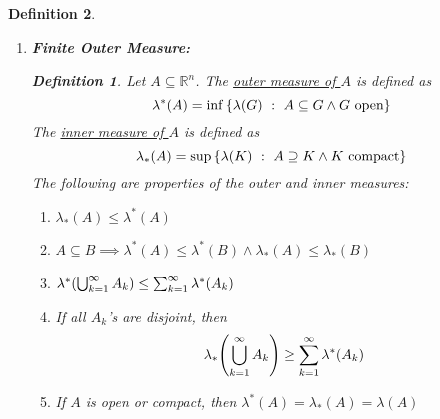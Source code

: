 \documentclass[]{article}
\newcommand{\R}{\mathbb{R}}
\newcommand{\st}{\ : \ }
\newtheorem{definition}{Definition}
\begin{document}
\begin{definition}
\begin{enumerate}
            The Lebesgue Measure of a compact set is defined as \[
                \lambda(K) = \inf \{
                    \lambda(G) \st K \subset G, \ G \textnormal{ is an open set}
                \}
            \] The following are some properties of the Lebesgue Measure for compact sets: \begin{enumerate}
                \item $0 \leq \lambda(K) \leq \infty$
                \item $K_1 \subseteq K_2 \implies \lambda(K_1) \leq \lambda(K_2)$
                \item $\lambda(K_1 \cup K_2) \leq \lambda(K_1) + \lambda(K_2)$
                \item $K_1 \cap K_2 = \emptyset \implies \lambda(K_1 \cup K_2) = \lambda(K_1) + \lambda(K_2)$
            \end{enumerate}
        \item \emph{\textbf{Finite Outer Measure:}}
            \begin{definition}
                Let $A \subseteq \R^n$.
                The \emph{\underline{outer measure of $A$}} is defined as \[
                    \lambda^*(A) = \inf \qty{
                        \lambda(G) \st A \subseteq G \land G \ \text{open}
                    }
                \] The \emph{\underline{inner measure of $A$}} is defined as \[
                    \lambda_*(A) = \sup \qty{
                        \lambda(K) \st A \supseteq K \land K \ \text{compact}
                    }
                \] The following are properties of the outer and inner measures:\begin{enumerate}
                    \item $\lambda_*(A) \leq \lambda^*(A)$
                    \item $A \subseteq B \implies \lambda^*(A) \leq \lambda^*(B) \land \lambda_*(A) \leq \lambda_*(B)$
                    \item $\lambda^*\qty(
                        \bigcup_{k=1}^{\infty} A_k
                    ) \leq \sum_{k=1}^{\infty} \lambda^*(A_k)$
                    \item If all $A_k$'s are disjoint, then \[\lambda_{*}\qty(
                            \bigcup_{k=1}^{\infty} A_k
                        ) \geq \sum_{k=1}^{\infty} \lambda^*(A_k)
                    \] \item If $A$ is open or compact, then $\lambda^*(A) = \lambda_*(A) = \lambda(A)$
                \end{enumerate}

\end{definition}
\end{enumerate}
\end{definition}
\end{document}
